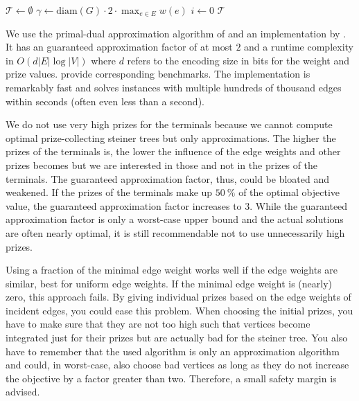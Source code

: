 \documentclass{bioinfo}
\begin{document}
\begin{algorithm}[h]
\SetAlgoLined
{}
 $\mathcal{T} \gets \emptyset$\;
 $\gamma \gets \text{diam}(G)\cdot 2\cdot \max_{e\in E} w(e)$\;
 $i \gets 0$\;
 \Return $\mathcal{T}$
 \caption{$\mathtt{enumerate\_diverse}$}
 \label{alg:enum}
\end{algorithm}

We use the primal-dual approximation algorithm of \cite{goemans1995general} and an implementation by \cite{hegde2015nearly}.
It has an guaranteed approximation factor of at most $2$ and a runtime complexity in $O(d |E| \log |V|)$ where $d$ refers to the encoding size in bits for the weight and prize values.
\cite{hegde2014fast} provide corresponding benchmarks.
The implementation is remarkably fast and solves instances with multiple hundreds of thousand edges within seconds (often even less than a second).

We do not use very high prizes for the terminals because we cannot compute optimal prize-collecting steiner trees but only approximations.
The higher the prizes of the terminals is, the lower the influence of the edge weights and other prizes becomes but we are interested in those and not in the prizes of the terminals.
The guaranteed approximation factor, thus, could be bloated and weakened.
If the prizes of the terminals make up $\SI{50}{\percent}$ of the optimal objective value, the guaranteed approximation factor increases to $3$.
While the guaranteed approximation factor is only a worst-case upper bound and the actual solutions are often nearly optimal, it is still recommendable not to use unnecessarily high prizes.

Using a fraction of the minimal edge weight works well if the edge weights are similar, best for uniform edge weights.
If the minimal edge weight is (nearly) zero, this approach fails.
By giving individual prizes based on the edge weights of incident edges, you could ease this problem.
When choosing the initial prizes, you have to make sure that they are not too high such that vertices become integrated just for their prizes but are actually bad for the steiner tree.
You also have to remember that the used algorithm is only an approximation algorithm and could, in worst-case, also choose bad vertices as long as they do not increase the objective by a factor greater than two.
Therefore, a small safety margin is advised.
\end{document}
